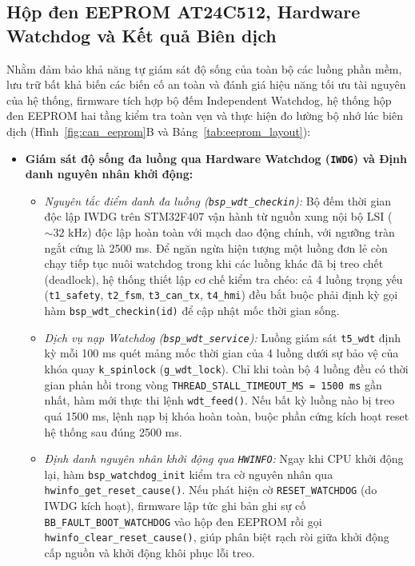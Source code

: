 \subsection{Hộp đen EEPROM AT24C512, Hardware Watchdog và Kết quả Biên dịch}
Nhằm đảm bảo khả năng tự giám sát độ sống của toàn bộ các luồng phần mềm, lưu trữ bất khả biến các biến cố an toàn và đánh giá hiệu năng tối ưu tài nguyên của hệ thống, firmware tích hợp bộ đếm Independent Watchdog, hệ thống hộp đen EEPROM hai tầng kiểm tra toàn vẹn và thực hiện đo lường bộ nhớ lúc biên dịch (Hình~\ref{fig:can_eeprom}B và Bảng~\ref{tab:eeprom_layout}):
\begin{itemize}[nosep]
    \item \textbf{Giám sát độ sống đa luồng qua Hardware Watchdog (\textmd{\texttt{IWDG}}) và Định danh nguyên nhân khởi động:}
    \begin{itemize}[nosep]
        \item \textit{Nguyên tắc điểm danh đa luồng (\texttt{bsp\_wdt\_checkin}):} Bộ đếm thời gian độc lập IWDG trên STM32F407 vận hành từ nguồn xung nội bộ LSI ($\sim 32\text{ kHz}$) độc lập hoàn toàn với mạch dao động chính, với ngưỡng tràn ngắt cứng là 2500 ms. Để ngăn ngừa hiện tượng một luồng đơn lẻ còn chạy tiếp tục nuôi watchdog trong khi các luồng khác đã bị treo chết (deadlock), hệ thống thiết lập cơ chế kiểm tra chéo: cả 4 luồng trọng yếu (\texttt{t1\_safety}, \texttt{t2\_fsm}, \texttt{t3\_can\_tx}, \texttt{t4\_hmi}) đều bắt buộc phải định kỳ gọi hàm \texttt{bsp\_wdt\_checkin(id)} để cập nhật mốc thời gian sống.
        \item \textit{Dịch vụ nạp Watchdog (\texttt{bsp\_wdt\_service}):} Luồng giám sát \texttt{t5\_wdt} định kỳ mỗi 100 ms quét mảng mốc thời gian của 4 luồng dưới sự bảo vệ của khóa quay \texttt{k\_spinlock} (\texttt{g\_wdt\_lock}). Chỉ khi toàn bộ 4 luồng đều có thời gian phản hồi trong vòng \texttt{THREAD\_STALL\_TIMEOUT\_MS = 1500 ms} gần nhất, hàm mới thực thi lệnh \texttt{wdt\_feed()}. Nếu bất kỳ luồng nào bị treo quá 1500 ms, lệnh nạp bị khóa hoàn toàn, buộc phần cứng kích hoạt reset hệ thống sau đúng 2500 ms.
        \item \textit{Định danh nguyên nhân khởi động qua \texttt{HWINFO}:} Ngay khi CPU khởi động lại, hàm \texttt{bsp\_watchdog\_init} kiểm tra cờ nguyên nhân qua \texttt{hwinfo\_get\_\allowbreak reset\_\allowbreak cause()}. Nếu phát hiện cờ \texttt{RESET\_\allowbreak WATCHDOG} (do IWDG kích hoạt), firmware lập tức ghi bản ghi sự cố \texttt{BB\_FAULT\_\allowbreak BOOT\_\allowbreak WATCHDOG} vào hộp đen EEPROM rồi gọi \texttt{hwinfo\_clear\_\allowbreak reset\_\allowbreak cause()}, giúp phân biệt rạch ròi giữa khởi động cấp nguồn và khởi động khôi phục lỗi treo.

\end{itemize}
\end{itemize}
